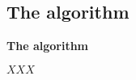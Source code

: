 \subsection{The \acronymMGRAO{}{} algorithm \citep{creech2021resource}}
\label{appendix:algorithm-mgrao}

\begin{algorithm}[ht]
	\DontPrintSemicolon
	\footnotesize
	\caption{\textbf{The \acronymMGRAO{}{} algorithm}}
	\label{alg:mgrao}
	{
		
		\nonl
		\;
		$XXX$ \;
	}
\end{algorithm}